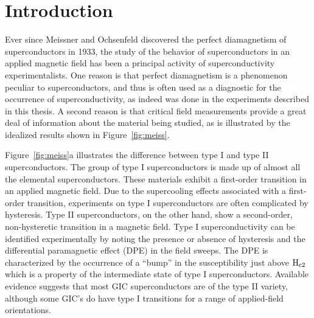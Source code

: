 \section{Introduction}
\label{critf:intro}
	Ever since   Meissner    and  Ochsenfeld  discovered the    perfect
diamagnetism of superconductors in 1933,\cite{meissner33}  the study of the
behavior of  superconductors   in  an applied magnetic   field has   been a
principal  activity  of superconductivity experimentalists.   One reason is
that perfect diamagnetism is a phenomenon  peculiar to superconductors, and
thus is often used as a diagnostic for the occurrence of superconductivity,
as indeed was done in the experiments described  in this thesis.  A second
reason    is that critical   field  measurements   provide a great  deal of
information about  the material being  studied,  as  is  illustrated by the
idealized results shown in Figure~\ref{fig:meiss}.


	Figure~\ref{fig:meiss}a  illustrates the  difference between type I
and type II superconductors.  The  group of type I superconductors  is made
up of almost all the elemental superconductors.   These materials exhibit a
first-order  transition  in  an applied   magnetic    field.   Due to   the
supercooling effects associated  with a first-order transition, experiments
on  type I  superconductors are often   complicated by hysteresis.  Type II
superconductors,  on the other  hand,  show a second-order,  non-hysteretic
transition in a magnetic field.  Type I superconductivity can be identified
experimentally  by  noting the presence  or absence of  hysteresis and  the
differential  paramagnetic  effect (DPE) in the  field  sweeps.  The DPE is
characterized by  the occurrence of a ``bump''   in the susceptibility just
above $\rm H_{c2}$ which is a property of the  intermediate state of type I
superconductors.\cite{hein61}  Available evidence suggests  that   most GIC
superconductors are of  the type  II  variety, although  some GIC's do have
type I transitions for a range of applied-field orientations.

